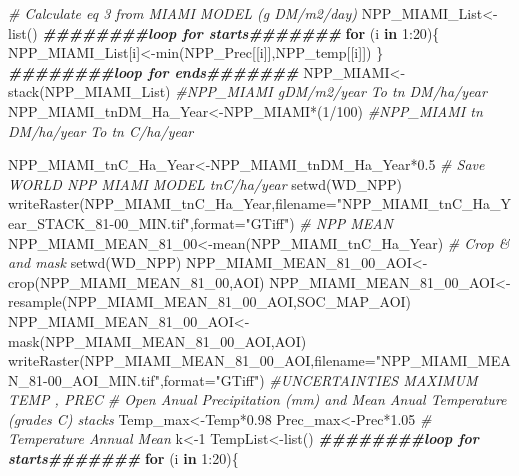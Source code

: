 \documentclass[
  10pt,
  b5paper,
]{book}
\newenvironment{Shaded}{\begin{snugshade}}{\end{snugshade}}
\newcommand{\AttributeTok}[1]{\textcolor[rgb]{0.77,0.63,0.00}{#1}}
\newcommand{\CommentTok}[1]{\textcolor[rgb]{0.56,0.35,0.01}{\textit{#1}}}
\newcommand{\ControlFlowTok}[1]{\textcolor[rgb]{0.13,0.29,0.53}{\textbf{#1}}}
\newcommand{\DecValTok}[1]{\textcolor[rgb]{0.00,0.00,0.81}{#1}}
\newcommand{\DocumentationTok}[1]{\textcolor[rgb]{0.56,0.35,0.01}{\textbf{\textit{#1}}}}
\newcommand{\FloatTok}[1]{\textcolor[rgb]{0.00,0.00,0.81}{#1}}
\newcommand{\FunctionTok}[1]{\textcolor[rgb]{0.00,0.00,0.00}{#1}}
\newcommand{\NormalTok}[1]{#1}
\newcommand{\OtherTok}[1]{\textcolor[rgb]{0.56,0.35,0.01}{#1}}
\newcommand{\SpecialCharTok}[1]{\textcolor[rgb]{0.00,0.00,0.00}{#1}}
\newcommand{\StringTok}[1]{\textcolor[rgb]{0.31,0.60,0.02}{#1}}
\begin{document}
\begin{Shaded}
\begin{Highlighting}[]
\CommentTok{\# Calculate eq 3 from MIAMI MODEL (g DM/m2/day)}
\NormalTok{NPP\_MIAMI\_List}\OtherTok{\textless{}{-}}\FunctionTok{list}\NormalTok{()}
\DocumentationTok{\#\#\#\#\#\#\#\#loop for starts\#\#\#\#\#\#\#}
\ControlFlowTok{for}\NormalTok{ (i }\ControlFlowTok{in} \DecValTok{1}\SpecialCharTok{:}\DecValTok{20}\NormalTok{)\{}
\NormalTok{NPP\_MIAMI\_List[i]}\OtherTok{\textless{}{-}}\FunctionTok{min}\NormalTok{(NPP\_Prec[[i]],NPP\_temp[[i]])}
\NormalTok{\}}
\DocumentationTok{\#\#\#\#\#\#\#\#loop for ends\#\#\#\#\#\#\#}
\NormalTok{NPP\_MIAMI}\OtherTok{\textless{}{-}}\FunctionTok{stack}\NormalTok{(NPP\_MIAMI\_List)}
\CommentTok{\#NPP\_MIAMI gDM/m2/year To tn DM/ha/year}
\NormalTok{NPP\_MIAMI\_tnDM\_Ha\_Year}\OtherTok{\textless{}{-}}\NormalTok{NPP\_MIAMI}\SpecialCharTok{*}\NormalTok{(}\DecValTok{1}\SpecialCharTok{/}\DecValTok{100}\NormalTok{)}
\CommentTok{\#NPP\_MIAMI tn DM/ha/year To tn C/ha/year}

\NormalTok{NPP\_MIAMI\_tnC\_Ha\_Year}\OtherTok{\textless{}{-}}\NormalTok{NPP\_MIAMI\_tnDM\_Ha\_Year}\SpecialCharTok{*}\FloatTok{0.5}
\CommentTok{\# Save WORLD NPP MIAMI MODEL tnC/ha/year}
\FunctionTok{setwd}\NormalTok{(WD\_NPP)}
\FunctionTok{writeRaster}\NormalTok{(NPP\_MIAMI\_tnC\_Ha\_Year,}\AttributeTok{filename=}\StringTok{"NPP\_MIAMI\_tnC\_Ha\_Year\_STACK\_81{-}00\_MIN.tif"}\NormalTok{,}\AttributeTok{format=}\StringTok{"GTiff"}\NormalTok{)}
\CommentTok{\# NPP MEAN}
\NormalTok{NPP\_MIAMI\_MEAN\_81\_00}\OtherTok{\textless{}{-}}\FunctionTok{mean}\NormalTok{(NPP\_MIAMI\_tnC\_Ha\_Year)}
\CommentTok{\# Crop \& and mask}
\FunctionTok{setwd}\NormalTok{(WD\_NPP)}
\NormalTok{NPP\_MIAMI\_MEAN\_81\_00\_AOI}\OtherTok{\textless{}{-}}\FunctionTok{crop}\NormalTok{(NPP\_MIAMI\_MEAN\_81\_00,AOI)}
\NormalTok{NPP\_MIAMI\_MEAN\_81\_00\_AOI}\OtherTok{\textless{}{-}}\FunctionTok{resample}\NormalTok{(NPP\_MIAMI\_MEAN\_81\_00\_AOI,SOC\_MAP\_AOI)}
\NormalTok{NPP\_MIAMI\_MEAN\_81\_00\_AOI}\OtherTok{\textless{}{-}}\FunctionTok{mask}\NormalTok{(NPP\_MIAMI\_MEAN\_81\_00\_AOI,AOI)}
\FunctionTok{writeRaster}\NormalTok{(NPP\_MIAMI\_MEAN\_81\_00\_AOI,}\AttributeTok{filename=}\StringTok{"NPP\_MIAMI\_MEAN\_81{-}00\_AOI\_MIN.tif"}\NormalTok{,}\AttributeTok{format=}\StringTok{"GTiff"}\NormalTok{)}
\CommentTok{\#UNCERTAINTIES MAXIMUM TEMP , PREC}
\CommentTok{\# Open Anual Precipitation (mm) and Mean Anual Temperature (grades C) stacks}
\NormalTok{Temp\_max}\OtherTok{\textless{}{-}}\NormalTok{Temp}\SpecialCharTok{*}\FloatTok{0.98}
\NormalTok{Prec\_max}\OtherTok{\textless{}{-}}\NormalTok{Prec}\SpecialCharTok{*}\FloatTok{1.05}
\CommentTok{\# Temperature Annual Mean }
\NormalTok{k}\OtherTok{\textless{}{-}}\DecValTok{1}
\NormalTok{TempList}\OtherTok{\textless{}{-}}\FunctionTok{list}\NormalTok{()}
\DocumentationTok{\#\#\#\#\#\#\#\#loop for starts\#\#\#\#\#\#\#}
\ControlFlowTok{for}\NormalTok{ (i }\ControlFlowTok{in} \DecValTok{1}\SpecialCharTok{:}\DecValTok{20}\NormalTok{)\{}


\end{Highlighting}
\end{Shaded}
\end{document}
